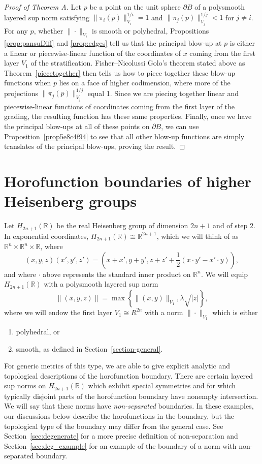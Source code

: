 \documentclass{article}
\theoremstyle{definition}
\newcommand{\norm}[1]{\|#1\|}
\newcommand{\HHR}{H_{2n+1}(\mathbb{R})}
\newcommand{\R}{{\mathbb R}}
\begin{document}
\begin{proof}[Proof of Theorem A]
Let $p$ be a point on the unit sphere $\partial B$ of a polysmooth layered sup norm satisfying $\norm{\pi_i(p)}_{V_i}^{1/i} = 1$ and $\norm{\pi_j(p)}_{V_j}^{1/j} < 1$ for $j\neq i$. For any $p$, whether $\norm{\cdot}_{V_i}$ is smooth or polyhedral,
Propositions \ref{prop:pansuDiff} and \ref{prop:edges} tell us that the principal blow-up at $p$ is either a linear or piecewise-linear function of the coordinates of $x$ coming from the first layer $V_1$ of the stratification. Fisher--Nicolussi Golo's theorem stated above as Theorem~\ref{piecetogether} then tells us how to piece together these blow-up functions when $p$ lies on a face of higher codimension, where more of the projections $\norm{\pi_j(p)}_{V_j}^{1/j}$ equal 1. Since we are piecing together linear and piecewise-linear functions of coordinates coming from the first layer of the grading, the resulting function has these same properties.
Finally, once we have the principal blow-ups at all of these points on $\partial B$, we can use Proposition~\ref{prop5e8c4f94} to see that all other blow-up functions are simply translates of the principal blow-ups, proving the result.
\end{proof}





\section{Horofunction boundaries of higher Heisenberg groups}
Let $\HHR$ be the real Heisenberg group of dimension $2n+1$ and of step 2. In exponential coordinates, $\HHR \cong \R^{2n+1}$, which we will think of as $\R^n \times \R^n \times \R$, where
\[
(x,y,z) (x', y', z') = \left(x + x', y + y', z + z' + \frac12(x\cdot y' - x'\cdot y)\right),
\]
and where $\cdot$ above represents the standard inner product on $\R^n$. We will equip $\HHR$ with a polysmooth layered sup norm
\[
\norm{(x,y,z)} = \max\left\{\norm{(x,y)}_{V_1}, \lambda\sqrt{|z|}\right\},
\]
where we will endow the first layer $V_1 \cong R^{2n}$ with a norm $\norm{\cdot}_{V_1}$ which is either
\begin{enumerate}
\item polyhedral, or
\item smooth, as defined in Section~\ref{section-general}.
\end{enumerate}
For generic metrics of this type, we are able to give explicit analytic and topological descriptions of the horofunction boundary. There are certain layered sup norms on $\HHR$ which exhibit special symmetries and for which typically disjoint parts of the horofunction boundary have nonempty intersection. We will say that these norms have {\em non-separated} boundaries. In these examples, our discussions below describe the horofunctions in the boundary, but the topological type of the boundary may differ from the general case. See Section~\ref{sec:degenerate} for a more precise definition of non-separation and Section~\ref{sec:deg_example} for an example of the boundary of a norm with non-separated boundary.
\end{document}
